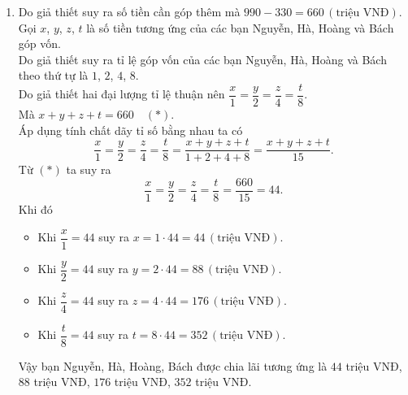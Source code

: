 \begin{bt}
{\begin{enumerate}
		 $$\dfrac{x}{1} = \dfrac{y}{2} = \dfrac{z}{4} = \dfrac{t}{8} = \dfrac{x + y + z + t}{1 + 2 + 4 + 8} = \dfrac{x + y + z + t}{15}.$$
		 Từ $(*)$ ta suy ra 
		 $$\dfrac{x}{1} = \dfrac{y}{2} = \dfrac{z}{4} = \dfrac{t}{8} =  \dfrac{165}{15} = 11.$$
		 Khi đó 
		 \begin{itemize}
		 	\item Khi $\dfrac{x}{1} = 11$ suy ra $x = 1\cdot 11 = 11\, \left(\mathrm{\text{triệu VNĐ}}\right)$.
		 	\item Khi $\dfrac{y}{2} = 11$ suy ra $y = 2\cdot 11 = 22\, \left(\mathrm{\text{triệu VNĐ}}\right)$.
		 	\item Khi $\dfrac{z}{4} = 11$ suy ra $z = 4\cdot 11 = 44\, \left(\mathrm{\text{triệu VNĐ}}\right)$.
		 	\item Khi $\dfrac{t}{8} = 11$ suy ra $t = 8\cdot 11 = 88\, \left(\mathrm{\text{triệu VNĐ}}\right)$.
		 \end{itemize}
   Vậy bạn Nguyễn, Hà, Hoàng, Bách được chia lãi tướng ứng là $11$ triệu VNĐ, $22$ triệu VNĐ, $44$ triệu VNĐ, $88$ triệu VNĐ.
		\item Do giả thiết suy ra số tiền cần góp thêm mà $990 - 330 = 660\, \left(\mathrm{\text{triệu VNĐ}}\right)$.\\
		 Gọi $x$, $y$, $z$, $t$ là số tiền tương ứng của các bạn Nguyễn, Hà, Hoàng và Bách góp vốn.\\
		 Do giả thiết suy ra tỉ lệ góp vốn của các bạn Nguyễn, Hà, Hoàng và Bách theo thứ tự là $1$, $2$, $4$, $8$.\\
		 Do giả thiết hai đại lượng tỉ lệ thuận nên $\dfrac{x}{1} = \dfrac{y}{2} = \dfrac{z}{4} = \dfrac{t}{8}$.\\
		 Mà $x + y + z + t = 660\quad (*)$.\\
		 Áp dụng tính chất dãy tỉ số bằng nhau ta có 
		 $$\dfrac{x}{1} = \dfrac{y}{2} = \dfrac{z}{4} = \dfrac{t}{8} = \dfrac{x + y + z + t}{1 + 2 + 4 + 8} = \dfrac{x + y + z + t}{15}.$$
		 Từ $(*)$ ta suy ra 
		 $$\dfrac{x}{1} = \dfrac{y}{2} = \dfrac{z}{4} = \dfrac{t}{8} =  \dfrac{660}{15} = 44.$$
		 Khi đó 
		 \begin{itemize}
		 	\item Khi $\dfrac{x}{1} = 44$ suy ra $x = 1\cdot 44 = 44\, \left(\mathrm{\text{triệu VNĐ}}\right)$.
		 	\item Khi $\dfrac{y}{2} = 44$ suy ra $y = 2\cdot 44 = 88\, \left(\mathrm{\text{triệu VNĐ}}\right)$.
		 	\item Khi $\dfrac{z}{4} = 44$ suy ra $z = 4\cdot 44 = 176\, \left(\mathrm{\text{triệu VNĐ}}\right)$.
		 	\item Khi $\dfrac{t}{8} = 44$ suy ra $t = 8\cdot 44 = 352\, \left(\mathrm{\text{triệu VNĐ}}\right)$.
		 \end{itemize}
		 Vậy bạn Nguyễn, Hà, Hoàng, Bách được chia lãi tương ứng là $44$ triệu VNĐ, $88$ triệu VNĐ, $176$ triệu VNĐ, $352$ triệu VNĐ.
	\end{enumerate}
}
\end{bt}

